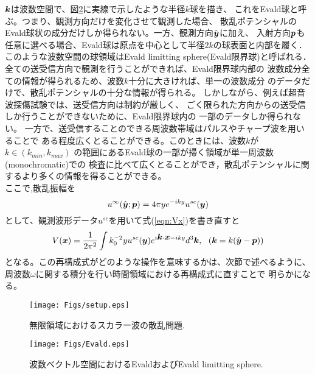 \documentclass[10pt,a4j,dvipdfmx]{jarticle}
\begin{document}
$\mbox{\boldmath $k$}$は波数空間で、図\ref{fig:Evald}に実線で示したような半径$k$球を描き、
これをEvald球と呼ぶ。つまり、観測方向だけを変化させて観測した場合、
散乱ポテンシャルのEvald球状の成分だけしか得られない。一方、観測方向$\hat{\mbox{\boldmath $y$}}$に加え、
入射方向$\mbox{\boldmath $p$}$も任意に選べる場合、Evald球は原点を中心として半径$2k$の球表面と内部を履く．
このような波数空間の球領域はEvald limitting sphere(Evald限界球)と呼ばれる．
全ての送受信方向で観測を行うことができれば、Evald限界球内部の
波数成分全ての情報が得られるため、波数$k$十分に大きければ、単一の波数成分
のデータだけで、散乱ポテンシャルの十分な情報が得られる。
しかしながら、例えば超音波探傷試験では、送受信方向は制約が厳しく、
ごく限られた方向からの送受信しか行うことができないために、Evald限界球内の
一部のデータしか得られない。
一方で、送受信することのできる周波数帯域はパルスやチャープ波を用いることで
ある程度広くとることができる。このときには、波数$k$が$k\in \left(k_{min},k_{max} \right)$
の範囲にあるEvald球の一部が掃く領域が単一周波数(monochromatic)での
検査に比べて広くとることができ，散乱ポテンシャルに関するより多くの情報を得ることができる。
\\

ここで,散乱振幅を
\begin{equation}
	u^{\infty}(\hat{\mbox{\boldmath $y$}};\mbox{\boldmath $p$})=4\pi ye^{-iky} u^{sc}(\mbox{\boldmath $y$})
	\label{eqn:}
\end{equation}
として、観測波形データ$u^{sc}$を用いて式(\ref{eqn:Vx})を書き直すと
\begin{equation}
	V(\mbox{\boldmath $x$}) =\frac{1}{2\pi^2} \int k_0^{-2} yu^{sc}(\mbox{\boldmath $y$})
	e^{i\mbox{\boldmath $k$}\cdot \mbox{\boldmath $x$}-iky}d^3\mbox{\boldmath $k$}, 
	\ \ (\mbox{\boldmath $k$}=k(\hat{\mbox{\boldmath $y$}}-\mbox{\boldmath $p$}))
	\label{eqn:Vx_usc}
\end{equation}
となる。この再構成式がどのような操作を意味するかは、次節で述べるように、
周波数$\omega$に関する積分を行い時間領域における再構成式に直すことで
明らかになる。
\begin{figure}[h]
	\begin{center}
	\texttt{[image: Figs/setup.eps]} 
	\end{center}
	\caption{無限領域におけるスカラー波の散乱問題.} 
	\label{fig:}
\end{figure}
\begin{figure}[h]
	\begin{center}
	\texttt{[image: Figs/Evald.eps]} 
	\end{center}
	\caption{波数ベクトル空間におけるEvaldおよびEvald limitting sphere.} 
	\label{fig:Evald}
\end{figure}
\end{document}
